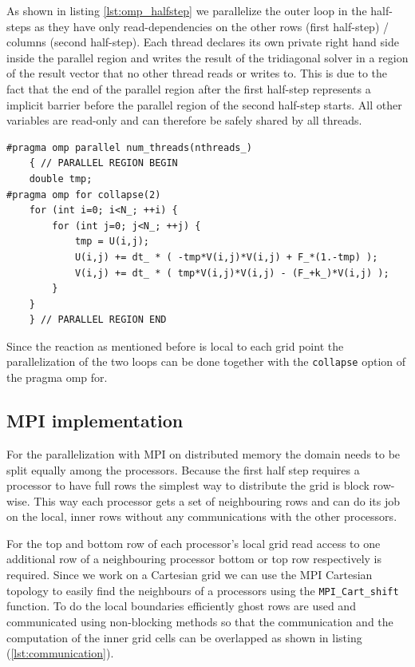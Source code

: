 \documentclass[11pt,a4paper]{article} %
\begin{document}
As shown in listing \ref{lst:omp_halfstep} we parallelize the outer loop in the half-steps as they have only read-dependencies on the other rows (first half-step) / columns (second half-step).
Each thread declares its own private right hand side inside the parallel region and writes the result of the tridiagonal solver in a region of the result vector that no other thread reads or writes to. 
This is due to the fact that the end of the parallel region after the first half-step represents a implicit barrier before the parallel region of the second half-step starts.
All other variables are read-only and can therefore be safely shared by all threads.

\begin{center}
\begin{verbatim}
#pragma omp parallel num_threads(nthreads_)
    { // PARALLEL REGION BEGIN
    double tmp;
#pragma omp for collapse(2)
    for (int i=0; i<N_; ++i) {
        for (int j=0; j<N_; ++j) {
            tmp = U(i,j);
            U(i,j) += dt_ * ( -tmp*V(i,j)*V(i,j) + F_*(1.-tmp) );
            V(i,j) += dt_ * ( tmp*V(i,j)*V(i,j) - (F_+k_)*V(i,j) );
        }
    }
    } // PARALLEL REGION END
\end{verbatim}
\end{center}

Since the reaction as mentioned before is local to each grid point the parallelization of the two loops can be done together with the \texttt{collapse} option of the pragma omp for.

\subsection{MPI implementation}

For the parallelization with MPI on distributed memory the domain needs to be split equally among the processors.
Because the first half step requires a processor to have full rows the simplest way to distribute the grid is block row-wise.
This way each processor gets a set of neighbouring rows and can do its job on the local, inner rows without any communications with the other processors.

For the top and bottom row of each processor's local grid read access to one additional row of a neighbouring processor bottom or top row respectively is required.
Since we work on a Cartesian grid we can use the MPI Cartesian topology to easily find the neighbours of a processors using the \texttt{MPI\_Cart\_shift} function.
To do the local boundaries efficiently ghost rows are used and communicated using non-blocking methods so that the communication and the computation of the inner grid cells can be overlapped as shown in listing (\ref{lst:communication}).
\end{document}
